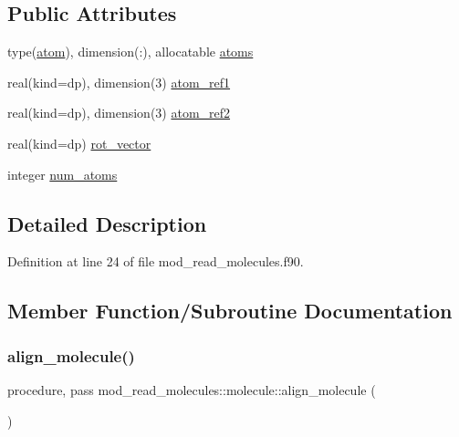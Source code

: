 \subsection*{Public Attributes}
\begin{DoxyCompactItemize}
\item 
type(\hyperlink{structmod__read__molecules_1_1atom}{atom}), dimension(\+:), allocatable \hyperlink{structmod__read__molecules_1_1molecule_ae8d206c2800181708eecd1bb59ae2398}{atoms}
\item 
real(kind=dp), dimension(3) \hyperlink{structmod__read__molecules_1_1molecule_aafb248ca2fd25241037a09bb54c0caec}{atom\+\_\+ref1}
\item 
real(kind=dp), dimension(3) \hyperlink{structmod__read__molecules_1_1molecule_ac6a7f4b6628d7bb7d8bb13705ebd7251}{atom\+\_\+ref2}
\item 
real(kind=dp) \hyperlink{structmod__read__molecules_1_1molecule_abcd2948db172b5f24fde039b58d82d53}{rot\+\_\+vector}
\item 
integer \hyperlink{structmod__read__molecules_1_1molecule_af6d48666287b580f267a1053dd9a5751}{num\+\_\+atoms}
\end{DoxyCompactItemize}


\subsection{Detailed Description}


Definition at line 24 of file mod\+\_\+read\+\_\+molecules.\+f90.



\subsection{Member Function/\+Subroutine Documentation}
\mbox{\label{structmod__read__molecules_1_1molecule_a5ba3ca5b80fdf1558f4e69006ec0d0b2}} 
\subsubsection{\texorpdfstring{align\+\_\+molecule()}{align\_molecule()}}
{\footnotesize\ttfamily procedure, pass mod\+\_\+read\+\_\+molecules\+::molecule\+::align\+\_\+molecule (\begin{DoxyParamCaption}{ }\end{DoxyParamCaption})}



